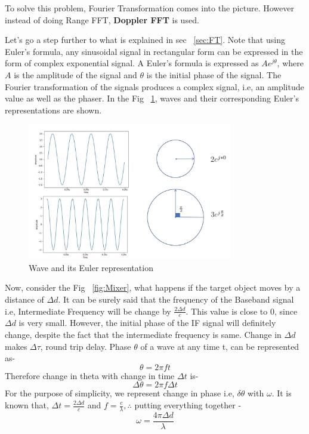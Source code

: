 To solve this problem, Fourier Transformation comes into the picture. However instead of doing Range FFT, \textbf{Doppler FFT} is used.

Let's go a step further to what is explained in sec ~\ref{sec:FT}. Note that using Euler's formula, any sinusoidal signal in rectangular form can be expressed in the form of complex exponential signal. A Euler's formula is expressed as \(Ae^{j\theta}\), where $A$ is the amplitude of the signal and $\theta$ is the initial phase of the signal. The Fourier transformation of the signals produces a complex signal, i.e, an amplitude value as well as the phaser. 
In the Fig ~\ref{fig:euler}, waves and their corresponding Euler's representations are shown.

 \begin{figure}[ht]
  \begin{center}
    \includegraphics[width=0.8\textwidth]{Master's thesis/images/euler.jpg} 
    \caption{Wave and its Euler representation}
    \label{fig:euler}
  \end{center}
\end{figure}  

Now, consider the Fig ~\ref{fig:Mixer}, what happens if the target object moves by a distance of $\Delta d$. It can be surely said that the frequency of the Baseband signal i.e, Intermediate Frequency will be change by $\frac{2\Delta d}{c}$. This value is close to 0, since $\Delta d$ is very small. However, the initial phase of the IF signal will definitely change, despite the fact that the intermediate frequency is same. Change in $\Delta d$ makes $\Delta\tau$, round trip delay.
Phase $\theta$ of a wave at any time t, can be represented as-
 \begin{equation}
     \theta= 2\pi ft
 \end{equation}
Therefore change in theta with change in time $\Delta t$ is-
 \begin{equation}
     \Delta\theta= 2\pi f\Delta t
 \end{equation}
 For the purpose of simplicity, we represent change in phase i.e, $\delta \theta$ with $\omega$. It is known that, $\Delta t= \frac{2\Delta d}{c}$ and $f= \frac{c}{\lambda},  \therefore$ putting everything together - 
 \begin{equation}\label{eq:theta}
     \omega= \frac{4\pi \Delta d}{\lambda}
 \end{equation} 

